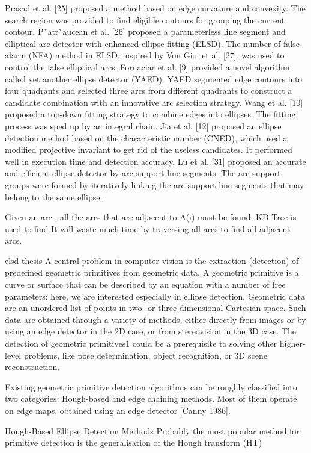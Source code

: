 \documentclass[a4paper]{report}
\begin{document}
Prasad et al. [25] proposed a method
based on edge curvature and convexity. The search region was
provided to find eligible contours for grouping the current
contour. Pˇatrˇaucean et al. [26] proposed a parameterless line
segment and elliptical arc detector with enhanced ellipse fitting
(ELSD). The number of false alarm (NFA) method in ELSD,
inspired by Von Gioi et al. [27], was used to control the false
elliptical arcs. Fornaciar et al. [9] provided a novel algorithm
called yet another ellipse detector (YAED). YAED segmented
edge contours into four quadrants and selected three arcs
from different quadrants to construct a candidate combination
with an innovative arc selection strategy. Wang et al. [10]
proposed a top-down fitting strategy to combine edges into
ellipses. The fitting process was sped up by an integral
chain. Jia et al. [12] proposed an ellipse
detection method based on the characteristic number (CNED),
which used a modified projective invariant to get rid of the
useless candidates. It performed well in execution time and
detection accuracy. Lu et al. [31] proposed an accurate and efficient ellipse detector
by arc-support line segments. The arc-support groups were
formed by iteratively linking the arc-support line segments that
may belong to the same ellipse. 

Given an arc , all the arcs that are adjacent to A(i) must be found. KD-Tree is used to find
It will waste much
time by traversing all arcs to find all adjacent arcs.

elsd thesis
A central problem in computer vision is the extraction (detection) of predefined geometric primitives
from geometric data. A geometric primitive is a curve or surface that can be described
by an equation with a number of free parameters; here, we are interested especially in ellipse
detection. Geometric data are an unordered list of points in two- or three-dimensional Cartesian
space. Such data are obtained through a variety of methods, either directly from images or by
using an edge detector in the 2D case, or from stereovision in the 3D case. The detection of
geometric primitives1 could be a prerequisite to solving other higher-level problems, like pose
determination, object recognition, or 3D scene reconstruction.

Existing geometric primitive detection algorithms can be roughly classified into two categories:
Hough-based and edge chaining methods. Most of them operate on edge maps, obtained
using an edge detector [Canny 1986].

Hough-Based Ellipse Detection Methods
Probably the most popular method for primitive detection is the generalisation of the Hough transform (HT)
\end{document}
